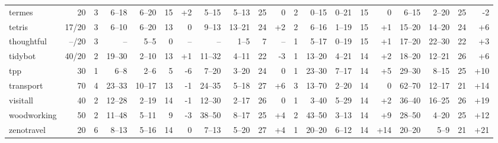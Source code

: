 \documentclass{article}
\begin{document}
\begin{table}[h]
\begin{tabular}{l@{}rr|rrrr|rrrr|r|rrrr|rrrr}
        termes &     20 &   3 &    6--18 &   6--20 &  15 &  {\color{blue}+2} &    5--15 &   5--13 &  25 &                  0 &   2 &     0--15 &   0--21 &  15 &                  0 &     6--15 &   2--20 &  25 &    {\color{red}-2} \\
        tetris &  17/20 &   3 &    6--10 &   6--20 &  13 &                 0 &    9--13 &  13--21 &  24 &   {\color{blue}+2} &   2 &     6--16 &   1--19 &  15 &   {\color{blue}+1} &    15--20 &  14--20 &  24 &   {\color{blue}+6} \\
    thoughtful &  --/20 &   3 &       -- &    5--5 &   0 &                -- &       -- &    1--5 &   7 &                 -- &   1 &     5--17 &   0--19 &  15 &   {\color{blue}+1} &    17--20 &  22--30 &  22 &   {\color{blue}+3} \\
       tidybot &  40/20 &   2 &   19--30 &   2--10 &  13 &  {\color{blue}+1} &   11--32 &   4--11 &  22 &    {\color{red}-3} &   1 &    13--20 &   4--21 &  14 &   {\color{blue}+2} &    18--20 &  12--21 &  26 &   {\color{blue}+6} \\
           tpp &     30 &   1 &     6--8 &    2--6 &   5 &   {\color{red}-6} &    7--20 &   3--20 &  24 &                  0 &   1 &    23--30 &   7--17 &  14 &   {\color{blue}+5} &    29--30 &   8--15 &  25 &  {\color{blue}+10} \\
     transport &     70 &   4 &   23--33 &  10--17 &  13 &   {\color{red}-1} &   24--35 &   5--18 &  27 &   {\color{blue}+6} &   3 &    13--70 &   2--20 &  14 &                  0 &    62--70 &  12--17 &  21 &  {\color{blue}+14} \\
      visitall &     40 &   2 &   12--28 &   2--19 &  14 &   {\color{red}-1} &   12--30 &   2--17 &  26 &                  0 &   1 &     3--40 &   5--29 &  14 &   {\color{blue}+2} &    36--40 &  16--25 &  26 &  {\color{blue}+19} \\
   woodworking &     50 &   2 &   11--48 &   5--11 &   9 &   {\color{red}-3} &   38--50 &   8--17 &  25 &   {\color{blue}+4} &   2 &    43--50 &   3--13 &  14 &   {\color{blue}+9} &    28--50 &   4--20 &  25 &  {\color{blue}+12} \\
    zenotravel &     20 &   6 &    8--13 &   5--16 &  14 &                 0 &    7--13 &   5--20 &  27 &   {\color{blue}+4} &   1 &    20--20 &   6--12 &  14 &  {\color{blue}+14} &    20--20 &    5--9 &  21 &  {\color{blue}+21} \\
\bottomrule
\end{tabular}

                        \end{table}
                        
\end{document}
